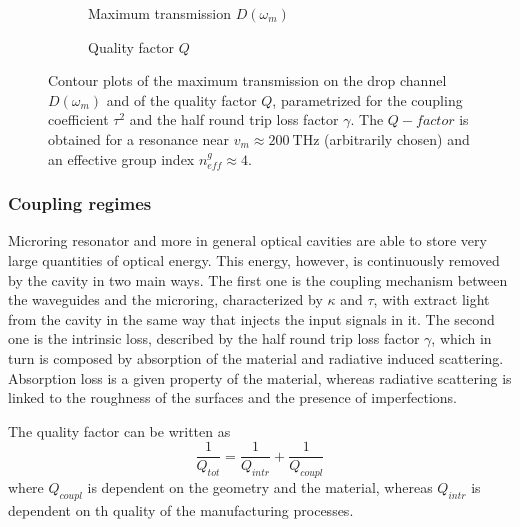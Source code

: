 \begin{figure}[!hbtp]
	\centering
	\begin{subfigure}[t]{0.5\textwidth}
		\centering
%		
		
		\caption{Maximum transmission $D\left( \omega_m \right)$}
		\label{fig:D_contour}
	\end{subfigure}
	\begin{subfigure}[t]{0.45\textwidth}
		\centering
%		
		
		\caption{Quality factor $Q$}
		\label{fig:Q_contour}
	\end{subfigure}
	\caption{Contour plots of the maximum transmission on the drop channel $D\left( \omega_m \right)$ and of the quality factor $Q$, parametrized for the coupling coefficient $\tau^2$ and the half round trip loss factor $\gamma$.
	The $Q-factor$ is obtained for a resonance near $v_m\approx\SI{200}{\THz}$ (arbitrarily chosen) and an effective group index $n_{eff}^g \approx 4$.
	}
	\label{fig:APF_contour_plots}
\end{figure}

\subsubsection{Coupling regimes}
\label{sssec:Coupling_regimes}
Microring resonator and more in general optical cavities are able to store very large quantities of optical energy.
This energy, however, is continuously removed by the cavity in two main ways.
The first one is the coupling mechanism between the waveguides and the microring, characterized by $\kappa$ and $\tau$, with extract light from the cavity in the same way that injects the input signals in it.
The second one is the intrinsic loss, described by the half round trip loss factor $\gamma$, which in turn is composed by absorption of the material and radiative induced scattering.
Absorption loss is a given property of the material, whereas radiative scattering is linked to the roughness of the surfaces and the presence of imperfections.

The quality factor can be written as
\begin{equation}
\frac{1}{Q_{tot}}=\frac{1}{Q_{intr}}+\frac{1}{Q_{coupl}}
\end{equation}
where $Q_{coupl}$ is dependent on the geometry and the material, whereas $Q_{intr}$ is dependent on th quality of the manufacturing processes.

